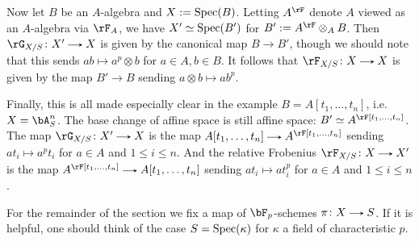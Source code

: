 \begin{definition}
\begin{subexample}
    Now let $B$ be an $A$-algebra and $X \mathrel{:=} \operatorname{Spec}(B)$. Letting $A^\rF$ denote $A$ viewed as an $A$-algebra via $\rF_A$, we have $X' \simeq \operatorname{Spec}(B')$ for $B' \ce A^\rF \otimes_A B$. Then $\rG_{X/S} \c X' \to X$ is given by the canonical map $B \to B'$, though we should note that this sends $ab \mapsto a^p \otimes b$ for $a \in A, b \in B$. It follows that $\rF_{X/S} \c X \to X$ is given by the map $B' \to B$ sending $a \otimes b \mapsto ab^p$.

    Finally, this is all made especially clear in the example $B = A[t_1,\ldots,t_n]$, i.e. $X = \bA^n_S$. The base change of affine space is still affine space: $B' \iso A^\rF[t_1,\ldots,t_n]$. The map $\rG_{X/S} \c X' \to X$ is the map $A[t_1,\ldots,t_n] \to A^\rF[t_1,\ldots,t_n]$ sending $at_i \mapsto a^pt_i$ for $a \in A$ and $1 \le i \le n$. And the relative Frobenius $\rF_{X/S} \c X \to X'$ is the map $A^\rF[t_1,\ldots,t_n] \to A[t_1,\ldots,t_n]$ sending $at_i \mapsto at_i^p$ for $a \in A$ and $1 \le i \le n$.
  \end{subexample}
\end{definition}

\begin{notation}
  \label{cartier-situation}
  For the remainder of the section we fix a map of $\bF_p$-schemes $\pi \c X \to S$. If it is helpful, one should think of the case $S = \operatorname{Spec}(\kappa)$ for $\kappa$ a field of characteristic $p$.
\end{notation}

